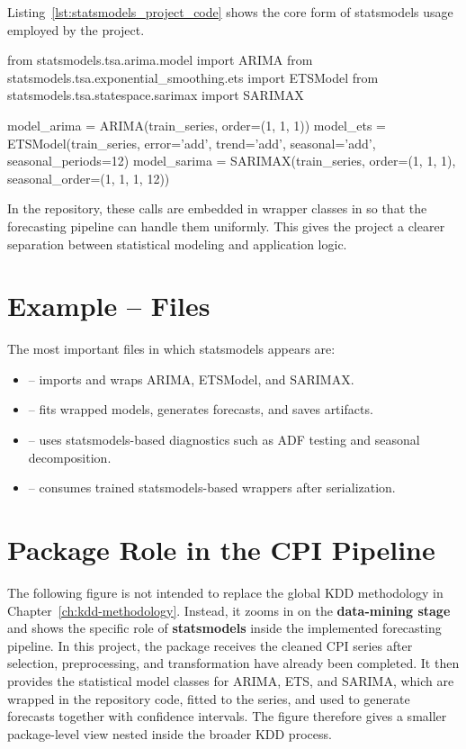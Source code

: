 Listing~\ref{lst:statsmodels_project_code} shows the core form of statsmodels usage employed by the project.

\begin{Python}[caption={Project-specific statsmodels model definitions}, label={lst:statsmodels_project_code}]
from statsmodels.tsa.arima.model import ARIMA
from statsmodels.tsa.exponential_smoothing.ets import ETSModel
from statsmodels.tsa.statespace.sarimax import SARIMAX

model_arima = ARIMA(train_series, order=(1, 1, 1))
model_ets = ETSModel(train_series, error='add', trend='add', seasonal='add', seasonal_periods=12)
model_sarima = SARIMAX(train_series, order=(1, 1, 1), seasonal_order=(1, 1, 1, 12))
\end{Python}

In the repository, these calls are embedded in wrapper classes in  so that the forecasting pipeline can handle them uniformly. This gives the project a clearer separation between statistical modeling and application logic.

\section{Example -- Files}

The most important files in which statsmodels appears are:

\begin{itemize}
    \item {} -- imports and wraps ARIMA, ETSModel, and SARIMAX.
    \item {} -- fits wrapped models, generates forecasts, and saves artifacts.
    \item {} -- uses statsmodels-based diagnostics such as ADF testing and seasonal decomposition.
    \item {} -- consumes trained statsmodels-based wrappers after serialization.
\end{itemize}

\section{Package Role in the CPI Pipeline}

The following figure is not intended to replace the global KDD methodology in Chapter~\ref{ch:kdd-methodology}. Instead, it zooms in on the \textbf{data-mining stage} and shows the specific role of \textbf{statsmodels} inside the implemented forecasting pipeline. In this project, the package receives the cleaned CPI series after selection, preprocessing, and transformation have already been completed. It then provides the statistical model classes for ARIMA, ETS, and SARIMA, which are wrapped in the repository code, fitted to the series, and used to generate forecasts together with confidence intervals. The figure therefore gives a smaller package-level view nested inside the broader KDD process.

